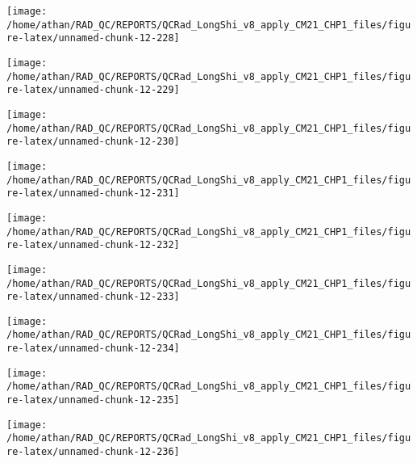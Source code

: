 \documentclass[
  10pt,
  a4paper,oneside]{article}
\begin{document}
\begin{center}\texttt{[image: /home/athan/RAD\_QC/REPORTS/QCRad\_LongShi\_v8\_apply\_CM21\_CHP1\_files/figure-latex/unnamed-chunk-12-228]} \end{center}

\begin{center}\texttt{[image: /home/athan/RAD\_QC/REPORTS/QCRad\_LongShi\_v8\_apply\_CM21\_CHP1\_files/figure-latex/unnamed-chunk-12-229]} \end{center}

\begin{center}\texttt{[image: /home/athan/RAD\_QC/REPORTS/QCRad\_LongShi\_v8\_apply\_CM21\_CHP1\_files/figure-latex/unnamed-chunk-12-230]} \end{center}

\begin{center}\texttt{[image: /home/athan/RAD\_QC/REPORTS/QCRad\_LongShi\_v8\_apply\_CM21\_CHP1\_files/figure-latex/unnamed-chunk-12-231]} \end{center}

\begin{center}\texttt{[image: /home/athan/RAD\_QC/REPORTS/QCRad\_LongShi\_v8\_apply\_CM21\_CHP1\_files/figure-latex/unnamed-chunk-12-232]} \end{center}

\begin{center}\texttt{[image: /home/athan/RAD\_QC/REPORTS/QCRad\_LongShi\_v8\_apply\_CM21\_CHP1\_files/figure-latex/unnamed-chunk-12-233]} \end{center}

\begin{center}\texttt{[image: /home/athan/RAD\_QC/REPORTS/QCRad\_LongShi\_v8\_apply\_CM21\_CHP1\_files/figure-latex/unnamed-chunk-12-234]} \end{center}

\begin{center}\texttt{[image: /home/athan/RAD\_QC/REPORTS/QCRad\_LongShi\_v8\_apply\_CM21\_CHP1\_files/figure-latex/unnamed-chunk-12-235]} \end{center}

\begin{center}\texttt{[image: /home/athan/RAD\_QC/REPORTS/QCRad\_LongShi\_v8\_apply\_CM21\_CHP1\_files/figure-latex/unnamed-chunk-12-236]} \end{center}
\end{document}
